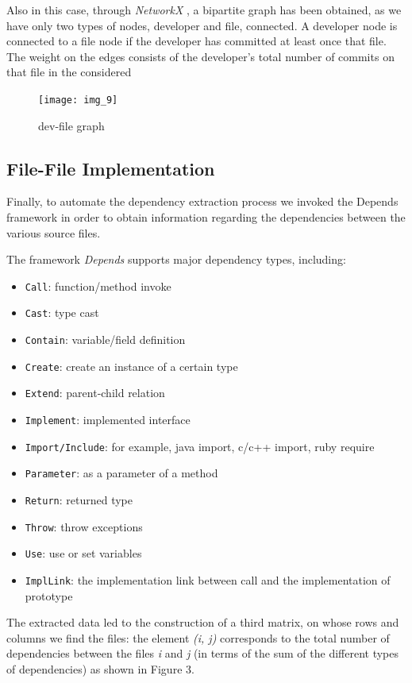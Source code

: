 \documentclass[sigconf]{acmart}
\begin{document}
Also in this case, through {\itshape NetworkX} , a bipartite graph has been obtained, as we have only two types of nodes, developer and file, connected. A developer node is connected to a file node if the developer has committed at least once that file. The weight on the edges consists of the developer’s total number of commits on that file in the considered

\begin{figure}[h]
  \centering
  \texttt{[image: img\_9]}
  \caption{dev-file graph}
  \Description{}
\end{figure}

\subsection{File-File Implementation}
Finally, to automate the dependency extraction process we invoked the Depends framework in order to obtain information regarding the dependencies between the various source files.

The framework {\itshape Depends} supports major dependency types, including:
\begin{itemize}
\item {\verb|Call|}: function/method invoke
\item {\verb|Cast|}: type cast
\item {\verb|Contain|}: variable/field definition
\item {\verb|Create|}: create an instance of a certain type
\item {\verb|Extend|}: parent-child relation
\item {\verb|Implement|}: implemented interface
\item {\verb|Import/Include|}: for example, java import, c/c++ import, ruby require
\item {\verb|Parameter|}: as a parameter of a method
\item {\verb|Return|}: returned type
\item {\verb|Throw|}: throw exceptions
\item {\verb|Use|}: use or set variables
\item {\verb|ImplLink|}: the implementation link between call and the implementation of prototype
\end{itemize}



The extracted data led to the construction of a third matrix, on whose rows and columns we find the files: the element {\itshape (i, j)} corresponds to the total number of dependencies between the files {\itshape i} and {\itshape j} (in terms of the sum of the different types of dependencies) as shown in Figure 3.
\end{document}
